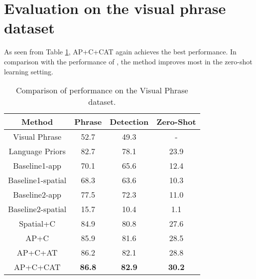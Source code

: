 \documentclass{article}
\begin{document}
\section{Evaluation on the visual phrase dataset}
As seen from Table \ref{tab1}, AP+C+CAT again achieves the best performance. In comparison with the performance of \cite{Itti2004Automatic}, the method improves most in the zero-shot learning setting.
\begin{table}[htbp]
\centering
\begin{tabular}{c|c|c|c}
\hline
Method & Phrase & Detection & Zero-Shot  \\
\hline
Visual Phrase & 52.7 & 49.3 & -  \\
\hline
Language Priors & 82.7 & 78.1 & 23.9  \\
\hline
Baseline1-app & 70.1 & 65.6 & 12.4  \\
\hline
Baseline1-spatial & 68.3 & 63.6 & 10.3  \\
\hline
Baseline2-app & 77.5 & 72.3 & 11.0  \\
\hline
Baseline2-spatial & 15.7 & 10.4 & 1.1  \\
\hline
Spatial+C & 84.9 & 80.8 & 27.6  \\
\hline
AP+C & 85.9 & 81.6 & 28.5  \\
\hline
AP+C+AT & 86.2 & 82.1 & 28.8\\
\hline
AP+C+CAT & \textbf{86.8} & \textbf{82.9} & \textbf{30.2}  \\
\hline
\end{tabular}
\caption{Comparison of performance on the Visual Phrase dataset.}
\label{tab1}
\end{table}


\end{document}

